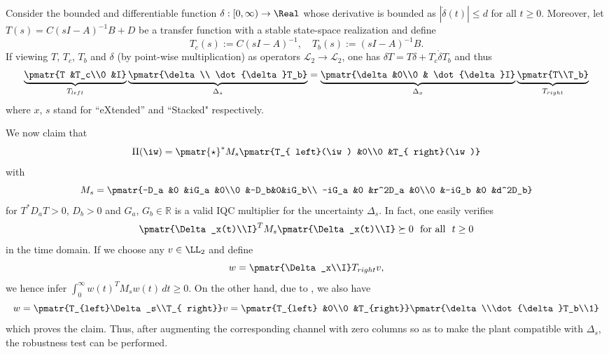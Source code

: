 \begin{lem}\label{lem:swap}
Consider the bounded and differentiable function $\delta:[0,\infty)\to\Real$ whose derivative is bounded as $|\dot{\delta}(t)| \leq d$ for all $t\geq 0$. Moreover, let $T(s) = C(sI-A)^{-1}B+D$ be a transfer function with a stable state-space realization and define
\begin{equation*}
T_c(s) :=  C(sI-A)^{-1}, \quad T_b(s) :=  (sI-A)^{-1}B.
\end{equation*}
If viewing $T$, $T_c$, $T_b$ and $\delta$ (by point-wise multiplication) as operators
$\mathcal{L}_2\to \mathcal{L}_2$, one has $\delta T = T\delta  + T_c \dot{\delta} T_b $ and thus
\begin{equation*}
\underbrace{\pmatr{T &T_c\\0 &I}}_{T_{ left}}\underbrace{
\pmatr{\delta\\ \dot{\delta}T_b}}_{\Delta_s} = \underbrace{\pmatr{\delta &0\\0 & \dot{\delta}I}}_{\Delta_x} \underbrace{\pmatr{T\\T_b}}_{T_{ right}}
\end{equation*}
where $x$, $s$ stand for ``eXtended'' and ``Stacked" respectively.
\end{lem}
We now claim that
\[
\Pi(\iw) = \pmatr{\star}^*{M}_s\pmatr{T_{ left}(\iw) &0\\0 &T_{ right}(\iw)}
\]
with
\[
{M}_s = \pmatr{-D_a &0 &iG_a &0\\0 &-D_b&0&iG_b\\ -iG_a &0 &r^2D_a &0\\0 &-iG_b &0 &d^2D_b}
\]
for $T^*D_aT > 0$, $D_b>0$ and $G_a$, $G_b\in\mathbb{R}$ is a valid IQC multiplier for the uncertainty $\Delta_s$. In fact,
one easily verifies
\[
\pmatr{\Delta_x(t)\\I}^TM_s\pmatr{\Delta_x(t)\\I} \succeq 0
\text{\ \ for all\ \ }t\geq 0
\]
in the time domain. If we choose any $v\in \LL_2$ and define
$$w=\pmatr{\Delta_x\\I}T_{right}v,$$
we hence infer $\int_0^\infty w(t)^TM_sw(t)\,dt\geq 0$. On the other hand, due to , we also have
$$
w=\pmatr{T_{left}\Delta_s\\T_{ right}}v=\pmatr{T_{left} &0\\0 &T_{right}}
\pmatr{\delta \\\dot{\delta}T_b\\1}
$$
which proves the claim. Thus, after augmenting the corresponding channel with zero columns so as to make the plant compatible with $\Delta_s$, the robustness test can be performed.


